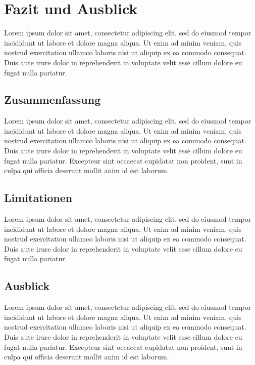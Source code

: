 
\section{Fazit und Ausblick}
\label{sec:fazit}

Lorem ipsum dolor sit amet, consectetur adipiscing elit, sed do eiusmod tempor
incididunt ut labore et dolore magna aliqua. Ut enim ad minim veniam, quis nostrud
exercitation ullamco laboris nisi ut aliquip ex ea commodo consequat. Duis aute
irure dolor in reprehenderit in voluptate velit esse cillum dolore eu fugat nulla
pariatur.


\subsection{Zusammenfassung}
\label{sec:zusammenfassung}

Lorem ipsum dolor sit amet, consectetur adipiscing elit, sed do eiusmod tempor
incididunt ut labore et dolore magna aliqua. Ut enim ad minim veniam, quis nostrud
exercitation ullamco laboris nisi ut aliquip ex ea commodo
consequat.\autocite[Vgl.][S. 100]{muster:artikel:2022}
Duis aute irure dolor in reprehenderit in voluptate velit esse cillum dolore eu
fugat nulla pariatur. Excepteur sint occaecat cupidatat non proident, sunt in culpa
qui officia deserunt mollit anim id est laborum.


\subsection{Limitationen}
\label{sec:limitationen}

Lorem ipsum dolor sit amet, consectetur adipiscing elit, sed do eiusmod tempor
incididunt ut labore et dolore magna aliqua. Ut enim ad minim veniam, quis nostrud
exercitation ullamco laboris nisi ut aliquip ex ea commodo consequat. Duis aute
irure dolor in reprehenderit in voluptate velit esse cillum dolore eu fugat nulla
pariatur.


\subsection{Ausblick}
\label{sec:ausblick}

Lorem ipsum dolor sit amet, consectetur adipiscing elit, sed do eiusmod tempor
incididunt ut labore et dolore magna aliqua. Ut enim ad minim veniam, quis nostrud
exercitation ullamco laboris nisi ut aliquip ex ea commodo
consequat.\autocite[Vgl.][S. 55]{muster:kapitel:2021}
Duis aute irure dolor in reprehenderit in voluptate velit esse cillum dolore eu
fugat nulla pariatur. Excepteur sint occaecat cupidatat non proident, sunt in culpa
qui officia deserunt mollit anim id est laborum.

\clearpage
